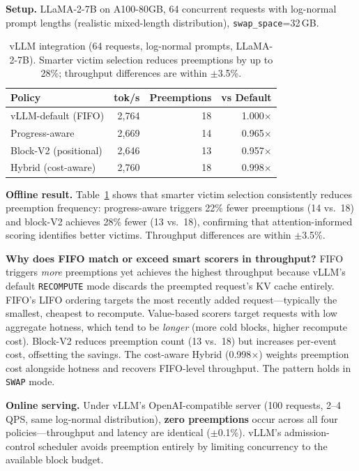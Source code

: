 \documentclass[conference]{IEEEtran}
\begin{document}
\textbf{Setup.} LLaMA-2-7B on A100-80GB, 64 concurrent requests with log-normal prompt lengths (realistic mixed-length distribution), \texttt{swap\_space}=32\,GB.

\begin{table}[t]
\centering
\caption{vLLM integration (64 requests, log-normal prompts, LLaMA-2-7B). Smarter victim selection reduces preemptions by up to 28\%; throughput differences are within $\pm$3.5\%.}
\label{tab:vllm-realistic}
\small
\setlength{\tabcolsep}{8pt}
\begin{tabular}{@{}lrrr@{}}
\toprule
Policy & tok/s & Preemptions & vs Default \\
\midrule
vLLM-default (FIFO)    & 2{,}764 & 18 & 1.000$\times$ \\
Progress-aware          & 2{,}669 & 14 & 0.965$\times$ \\
Block-V2 (positional)   & 2{,}646 & 13 & 0.957$\times$ \\
Hybrid (cost-aware)     & 2{,}760 & 18 & 0.998$\times$ \\
\bottomrule
\end{tabular}
\end{table}

\textbf{Offline result.} Table~\ref{tab:vllm-realistic} shows that smarter victim selection consistently reduces preemption frequency: progress-aware triggers 22\% fewer preemptions (14 vs.\ 18) and block-V2 achieves 28\% fewer (13 vs.\ 18), confirming that attention-informed scoring identifies better victims. Throughput differences are within $\pm$3.5\%.

\textbf{Why does FIFO match or exceed smart scorers in throughput?} FIFO triggers \emph{more} preemptions yet achieves the highest throughput because vLLM's default \texttt{RECOMPUTE} mode discards the preempted request's KV cache entirely. FIFO's LIFO ordering targets the most recently added request---typically the smallest, cheapest to recompute. Value-based scorers target requests with low aggregate hotness, which tend to be \emph{longer} (more cold blocks, higher recompute cost). Block-V2 reduces preemption count (13 vs.\ 18) but increases per-event cost, offsetting the savings. The cost-aware Hybrid (0.998$\times$) weights preemption cost alongside hotness and recovers FIFO-level throughput. The pattern holds in \texttt{SWAP} mode.

\textbf{Online serving.} Under vLLM's OpenAI-compatible server (100 requests, 2--4 QPS, same log-normal distribution), \textbf{zero preemptions} occur across all four policies---throughput and latency are identical ($\pm$0.1\%). vLLM's admission-control scheduler avoids preemption entirely by limiting concurrency to the available block budget.
\end{document}
